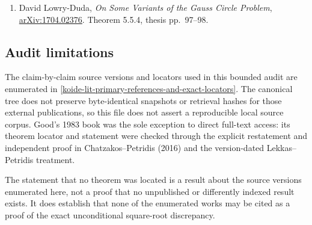 \begin{enumerate}
  \href{https://arxiv.org/abs/2501.15033}{arXiv:2501.15033v2};
  Theorems 1.1--1.2, pp.~2--3; Lemma 2.3, pp.~5--6. The global form-level
  hypothesis is \(t\det(f)\) square-free; the quantitative input is a smooth
  radial, congruence-orbit estimate with
  \[
   O_\varepsilon\!\left(
     d^{1+\varepsilon}T^{1/2+\theta+\varepsilon}
   \right).
  \]
\item
  David Lowry-Duda, \emph{On Some Variants of the Gauss Circle Problem}, \href{https://arxiv.org/abs/1704.02376}{arXiv:1704.02376}. Theorem 5.5.4, thesis pp.~97--98.
\end{enumerate}

\subsection{Audit limitations}\label{koide-lit-audit-limitations}

The claim-by-claim source versions and locators used in this bounded audit
are enumerated in
\cref{koide-lit-primary-references-and-exact-locators}.  The canonical tree
does not preserve byte-identical snapshots or retrieval hashes for those
external publications, so this file does not assert a reproducible local
source corpus.  Good's 1983 book was the sole exception to direct full-text
access: its theorem locator and statement were checked through the explicit
restatement and independent proof in Chatzakos--Petridis (2016) and the
version-dated Lekkas--Petridis treatment.

The statement that no theorem was located is a result about the source
versions enumerated here, not a proof that no unpublished or differently
indexed result exists.  It does establish that none of the enumerated works
may be cited as a proof of the exact unconditional square-root discrepancy.
